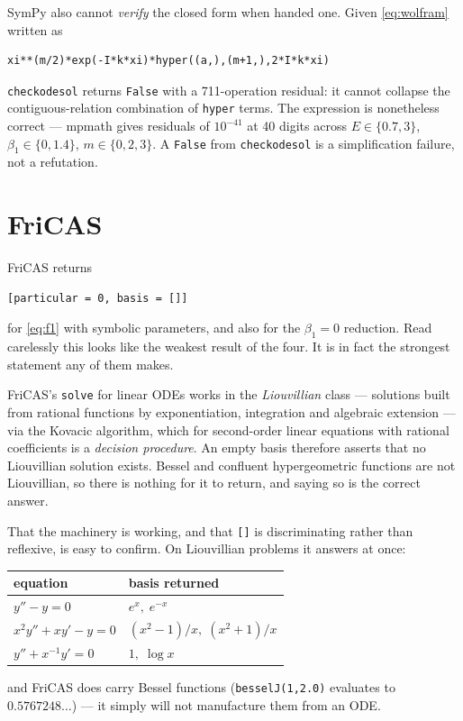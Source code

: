 \documentclass[11pt]{article}
\begin{document}
SymPy also cannot \emph{verify} the closed form when handed one.  Given
\eqref{eq:wolfram} written as
\begin{lstlisting}
xi**(m/2)*exp(-I*k*xi)*hyper((a,),(m+1,),2*I*k*xi)
\end{lstlisting}
\noindent\verb|checkodesol| returns \verb|False| with a 711-operation residual: it
cannot collapse the contiguous-relation combination of \verb|hyper| terms.
The expression is nonetheless correct --- mpmath gives residuals of
$10^{-41}$ at 40 digits across $E\in\{0.7,3\}$, $\beta_1\in\{0,1.4\}$,
$m\in\{0,2,3\}$.  A \verb|False| from \verb|checkodesol| is a simplification
failure, not a refutation.


\section{FriCAS}\label{sec:fricas}

FriCAS returns
\begin{lstlisting}
[particular = 0, basis = []]
\end{lstlisting}
\noindent for \eqref{eq:f1} with symbolic parameters, and also for the
$\beta_1=0$ reduction.  Read carelessly this looks like the weakest result
of the four.  It is in fact the strongest statement any of them makes.

FriCAS's \verb|solve| for linear ODEs works in the \emph{Liouvillian}
class --- solutions built from rational functions by exponentiation,
integration and algebraic extension --- via the Kovacic algorithm, which
for second-order linear equations with rational coefficients is a
\emph{decision procedure}.  An empty basis therefore asserts that no
Liouvillian solution exists.  Bessel and confluent hypergeometric
functions are not Liouvillian, so there is nothing for it to return, and
saying so is the correct answer.

That the machinery is working, and that \verb|[]| is discriminating rather
than reflexive, is easy to confirm.  On Liouvillian problems it answers at
once:
\begin{center}
\begin{tabular}{@{}ll@{}}
\toprule
equation & basis returned \\
\midrule
$y''-y=0$                 & $e^{x},\; e^{-x}$ \\
$x^2y''+xy'-y=0$          & $(x^2-1)/x,\; (x^2+1)/x$ \\
$y''+x^{-1}y'=0$          & $1,\; \log x$ \\
\bottomrule
\end{tabular}
\end{center}
\noindent and FriCAS does carry Bessel functions (\verb|besselJ(1,2.0)|
evaluates to $0.5767248\ldots$) --- it simply will not manufacture them
from an ODE.
\end{document}
